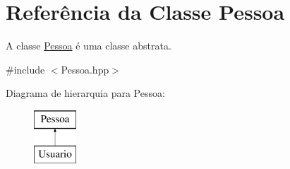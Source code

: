 \hypertarget{class_pessoa}{}\section{Referência da Classe Pessoa}
\label{class_pessoa}


A classe \mbox{\hyperlink{class_pessoa}{Pessoa}} é uma classe abstrata.  




{\ttfamily \#include $<$Pessoa.\+hpp$>$}

Diagrama de hierarquia para Pessoa\+:\begin{figure}[H]
\begin{center}
\leavevmode
\includegraphics[height=2.000000cm]{class_pessoa}
\end{center}
\end{figure}
